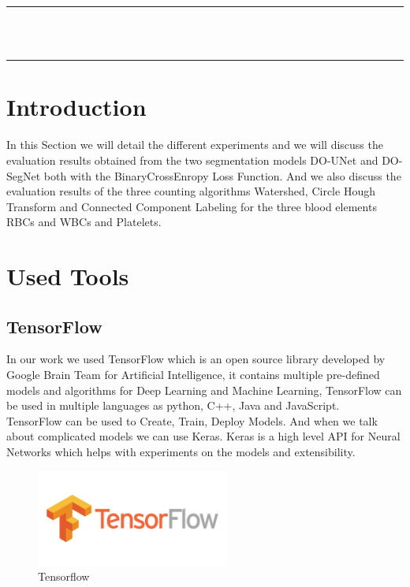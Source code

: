 \vspace*{\fill}
\begin{center}
    {\color{Black} \rule{\linewidth}{1.2mm} }\\
\vspace{0.25in}
{\centering{}}
\vspace{0.35in}\\
    {\color{Black} \rule{\linewidth}{1.2mm} }
\end{center}
\vspace*{\fill}
\setcounter{section}{0}

\newpage

\section{Introduction}
\vspace{0.2in}
\hspace{\parindent}
In this Section we will detail the different experiments and we will discuss the evaluation results obtained from the two segmentation models DO-UNet and DO-SegNet both with the BinaryCrossEnropy Loss Function. And we also discuss the evaluation results of the three counting algorithms Watershed, Circle Hough Transform and Connected Component Labeling for the three blood elements RBCs and WBCs and Platelets.

\section{Used Tools}
\subsection{TensorFlow}
\hspace{\parindent}
In our work we used TensorFlow which is an open source library developed by Google Brain Team for Artificial Intelligence, it contains multiple pre-defined models and algorithms for Deep Learning and Machine Learning, TensorFlow can be used in multiple languages as python, C++, Java and JavaScript.\\
TensorFlow can be used to Create, Train, Deploy Models. And when we talk about complicated models we can use Keras.
Keras is a high level API for Neural Networks which helps with experiments on the models and extensibility.

\begin{figure}[H]
    \centering
      \vspace{-0.1in}
        \centerline{\includegraphics[width = 2.5in]{../images/tensorflow.png}}
        \caption{Tensorflow}
        \label{Tensorflow}
    \end{figure}

